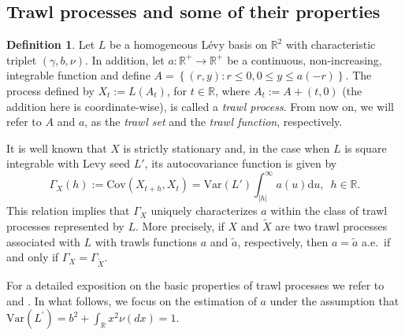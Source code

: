 \documentclass{article}
\theoremstyle{plain}
\theoremstyle{definition}
\newtheorem{definition}{Definition}
\theoremstyle{remark}
\newcommand{\Var}{\ensuremath{\mathrm{Var}}}
\newcommand{\Cov}{\ensuremath{\mathrm{Cov}}}
\newcommand{\Levy}{L\'{e}vy }
\begin{document}
\subsection{Trawl processes and some of their properties}
\begin{definition}	\label{def:trawldef}
	Let $L$ be a homogeneous \Levy basis on $\mathbb{R}^{2}$ with characteristic
	triplet $(\gamma,b,\nu)$. In addition, let $a:\mathbb{R}^{+}\rightarrow\mathbb{R}^{+}$
	be a continuous, non-increasing, integrable function and define 
	$
	A=\left\{ (r,y):r\leq0,0\leq y\leq a(-r)\right\}$.
	The process defined by
	$X_{t}:=L(A_{t})$, for $t\in\mathbb{R}$, 
	where $A_{t}:=A+(t,0)$ (the addition here is coordinate-wise), is called a \textit{trawl process}. From
	now on, we will refer to $A$ and $a$, as the  \textit{trawl set} and the  \textit{trawl
		function}, respectively. 
\end{definition}
It is well known that $X$ is strictly stationary
and, in the case when $L$ is square integrable with Levy seed $L'$, its autocovariance function is given by
\begin{equation}
	\varGamma_{X}(h):=\Cov(X_{t+h},X_{t})=\Var(L')\int_{\left|h\right|}^{\infty}a(u)\mathrm{d}u,\,\,\,h\in\mathbb{R}.\label{TrawlACF}
\end{equation}
This relation implies that $\varGamma_{X}$ uniquely characterizes $a$ within the class of trawl processes represented by $L$. More precisely,
if $X$ and $\tilde{X}$ are two trawl
processes associated with  $L$ with trawls functions $a$ and $\tilde{a}$,
respectively, then $a=\tilde{a}$ a.e.~if and only if
$\varGamma_{X}=\varGamma_{\tilde{X}}$.

For a detailed exposition on the basic properties of trawl processes
we refer to \cite{BNLSV2014} and \citet[Chapter 8]{BNBV2018-book}.
In what follows, we focus on the estimation of $a$ under the assumption
that 
$	\Var(L^{\prime})=b^{2}+\int_{\mathbb{R}}x^{2}\nu(dx)=1$.
\end{document}
